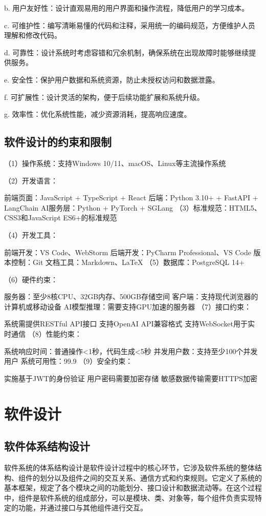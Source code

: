 \documentclass[
    report,     %
    oneside,    %
    UTF8,       %
    zihao=-4    %
]{config} %
\begin{document}
b. 用户友好性：设计直观易用的用户界面和操作流程，降低用户的学习成本。

c. 可维护性：编写清晰易懂的代码和注释，采用统一的编码规范，方便维护人员理解和修改代码。

d. 可靠性：设计系统时考虑容错和冗余机制，确保系统在出现故障时能够继续提供服务。

e. 安全性：保护用户数据和系统资源，防止未授权访问和数据泄露。

f. 可扩展性：设计灵活的架构，便于后续功能扩展和系统升级。

g. 效率性：优化系统性能，减少资源消耗，提高响应速度。
\subsection{软件设计的约束和限制}

（1）操作系统：支持Windows 10/11、macOS、Linux等主流操作系统

（2）开发语言：

前端页面：JavaScript + TypeScript + React
后端：Python 3.10+ + FastAPI + LangChain
AI服务层：Python + PyTorch + SGLang
（3）标准规范：HTML5、CSS3和JavaScript ES6+的标准规范

（4）开发工具：

前端开发：VS Code、WebStorm
后端开发：PyCharm Professional、VS Code
版本控制：Git
文档工具：Markdown、LaTeX
（5）数据库：PostgreSQL 14+

（6）硬件约束：

服务器：至少8核CPU、32GB内存、500GB存储空间
客户端：支持现代浏览器的计算机或移动设备
AI模型推理：需要支持GPU加速的服务器
（7）接口约束：

系统需提供RESTful API接口
支持OpenAI API兼容格式
支持WebSocket用于实时通信
（8）性能约束：

系统响应时间：普通操作<1秒，代码生成<5秒
并发用户数：支持至少100个并发用户
系统可用性：99.9%
（9）安全约束：

实施基于JWT的身份验证
用户密码需要加密存储
敏感数据传输需要HTTPS加密
\section{软件设计}
\subsection{软件体系结构设计}

软件系统的体系结构设计是软件设计过程中的核心环节，它涉及软件系统的整体结构、组件的划分以及组件之间的交互关系、通信方式和约束规则。它定义了系统的基本框架，规定了各个模块之间的功能划分、接口设计和数据流动等。在这个过程中，组件是软件系统的组成部分，可以是模块、类、对象等，每个组件负责实现特定的功能，并通过接口与其他组件进行交互。
\end{document}
